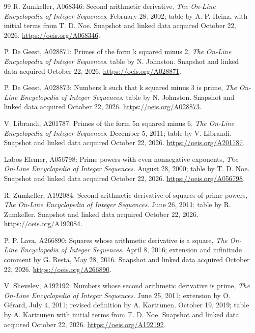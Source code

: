 \documentclass[11pt]{article}
\theoremstyle{definition}
\theoremstyle{remark}
\begin{document}
\begin{thebibliography}{99}
R. Zumkeller, A068346: Second arithmetic derivative,
\textit{The On-Line Encyclopedia of Integer Sequences}.
February 28, 2002; table by A. P. Heinz, with initial terms from T. D. Noe.
Snapshot and linked data acquired October 22, 2026.
\url{https://oeis.org/A068346}.

P. De Geest, A028871: Primes of the form k squared minus 2,
\textit{The On-Line Encyclopedia of Integer Sequences}.
table by N. Johnston.
Snapshot and linked data acquired October 22, 2026.
\url{https://oeis.org/A028871}.

P. De Geest, A028873: Numbers k such that k squared minus 3 is prime,
\textit{The On-Line Encyclopedia of Integer Sequences}.
table by N. Johnston.
Snapshot and linked data acquired October 22, 2026.
\url{https://oeis.org/A028873}.

V. Librandi, A201787: Primes of the form 5n squared minus 6,
\textit{The On-Line Encyclopedia of Integer Sequences}.
December 5, 2011; table by V. Librandi.
Snapshot and linked data acquired October 22, 2026.
\url{https://oeis.org/A201787}.

Labos Elemer, A056798: Prime powers with even nonnegative exponents,
\textit{The On-Line Encyclopedia of Integer Sequences}.
August 28, 2000; table by T. D. Noe.
Snapshot and linked data acquired October 22, 2026.
\url{https://oeis.org/A056798}.

R. Zumkeller, A192084: Second arithmetic derivative of squares of prime powers,
\textit{The On-Line Encyclopedia of Integer Sequences}.
June 26, 2011; table by R. Zumkeller.
Snapshot and linked data acquired October 22, 2026.
\url{https://oeis.org/A192084}.

P. P. Lava, A266890: Squares whose arithmetic derivative is a square,
\textit{The On-Line Encyclopedia of Integer Sequences}.
April 8, 2016; extension and infinitude comment by G. Resta, May 28, 2016.
Snapshot and linked data acquired October 22, 2026.
\url{https://oeis.org/A266890}.

V. Shevelev, A192192: Numbers whose second arithmetic derivative is prime,
\textit{The On-Line Encyclopedia of Integer Sequences}.
June 25, 2011; extension by O. G\'erard, July 4, 2011; revised definition by A. Karttunen, October 19, 2019; table by A. Karttunen with initial terms from T. D. Noe.
Snapshot and linked data acquired October 22, 2026.
\url{https://oeis.org/A192192}.


\end{thebibliography}
\end{document}
